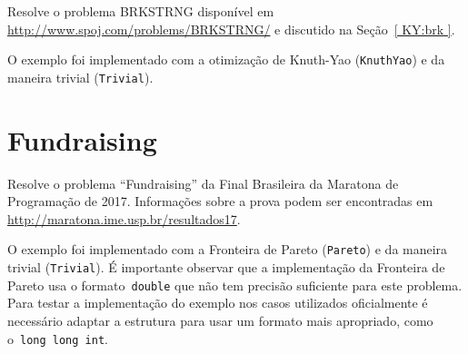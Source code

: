 Resolve o problema BRKSTRNG disponível em \href{http://www.spoj.com/problems/BRKSTRNG/}{http://www.spoj.com/problems/BRKSTRNG/} e discutido na Seção~\ref{ KY:brk }.

O exemplo foi implementado com a otimização de Knuth-Yao (\texttt{KnuthYao}) e da maneira trivial (\texttt{Trivial}).


\section{Fundraising} \label{Fundraising}

Resolve o problema ``Fundraising'' da Final Brasileira da Maratona de Programação de 2017. Informações sobre a prova podem ser encontradas em \href{http://maratona.ime.usp.br/resultados17}{http://maratona.ime.usp.br/resultados17}.

O exemplo foi implementado com a Fronteira de Pareto (\texttt{Pareto}) e da maneira trivial (\texttt{Trivial}). É importante observar que a implementação da Fronteira de Pareto usa o formato~\texttt{double} que não tem precisão suficiente para este problema. Para testar a implementação do exemplo nos casos utilizados oficialmente é necessário adaptar a estrutura para usar um formato mais apropriado, como o~\texttt{long long int}.
